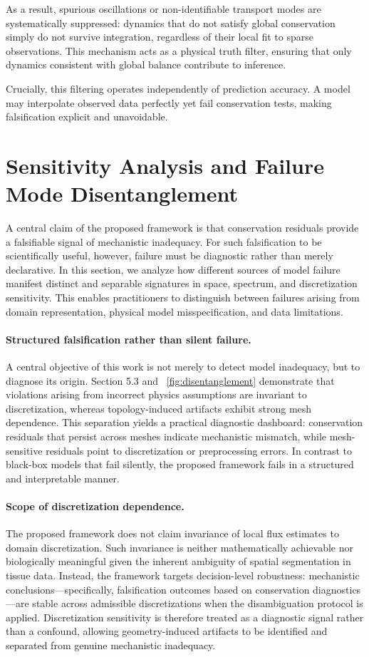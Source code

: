 \documentclass[10pt,article]{article}
\begin{document}
As a result, spurious oscillations or non-identifiable transport modes are systematically suppressed: dynamics that do not satisfy global conservation simply do not survive integration, regardless of their local fit to sparse observations. This mechanism acts as a physical truth filter, ensuring that only dynamics consistent with global balance contribute to inference.

Crucially, this filtering operates independently of prediction accuracy. A model may interpolate observed data perfectly yet fail conservation tests, making falsification explicit and unavoidable. 

\section{Sensitivity Analysis and Failure Mode Disentanglement}

A central claim of the proposed framework is that conservation residuals provide a falsifiable signal of mechanistic inadequacy. For such falsification to be scientifically useful, however, failure must be diagnostic rather than merely declarative. In this section, we analyze how different sources of model failure manifest distinct and separable signatures in space, spectrum, and discretization sensitivity. This enables practitioners to distinguish between failures arising from domain representation, physical model misspecification, and data limitations.
\paragraph{Structured falsification rather than silent failure.}
A central objective of this work is not merely to detect model inadequacy, but to diagnose its origin. Section 5.3 and ~\ref{fig:disentanglement} demonstrate that violations arising from incorrect physics assumptions are invariant to discretization, whereas topology-induced artifacts exhibit strong mesh dependence. This separation yields a practical diagnostic dashboard: conservation residuals that persist across meshes indicate mechanistic mismatch, while mesh-sensitive residuals point to discretization or preprocessing errors. In contrast to black-box models that fail silently, the proposed framework fails in a structured and interpretable manner.

\paragraph{Scope of discretization dependence.}
The proposed framework does not claim invariance of local flux estimates to domain discretization. Such invariance is neither mathematically achievable nor biologically meaningful given the inherent ambiguity of spatial segmentation in tissue data. Instead, the framework targets decision-level robustness: mechanistic conclusions—specifically, falsification outcomes based on conservation diagnostics—are stable across admissible discretizations when the disambiguation protocol is applied. Discretization sensitivity is therefore treated as a diagnostic signal rather than a confound, allowing geometry-induced artifacts to be identified and separated from genuine mechanistic inadequacy.
\end{document}
